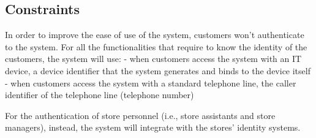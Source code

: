 \documentclass[../../main.tex]{subfiles}
\begin{document}
\subsection{Constraints}

In order to improve the ease of use of the system, customers won't authenticate to the system. For all the functionalities that require to know the identity of the customers, the system will use:
- when customers access the system with an IT device, a device identifier that the system generates and binds to the device itself
- when customers access the system with a standard telephone line, the caller identifier of the telephone line (telephone number)

For the authentication of store personnel (i.e., store assistants and store managers), instead, the system will integrate with the stores' identity systems.
\end{document}
